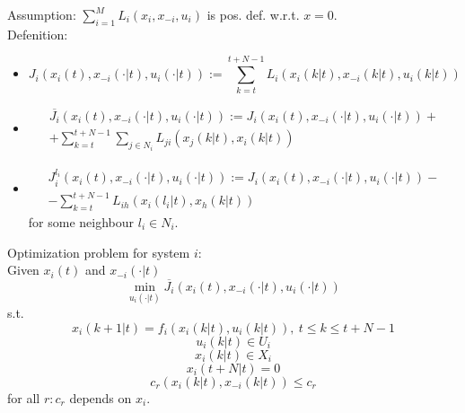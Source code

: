     Assumption: $\sum_{i=1}^M L_i(x_i,x_{-i},u_i)$ is pos. def. w.r.t. $x=0$.\\
    
    Defenition:
    \begin{itemize}
        \item    $$J_i(x_i(t),x_{-i}(\cdot|t),u_i(\cdot|t)) := \sum_{k=t}^{t+N-1} L_i(x_i(k|t),x_{-i}(k|t), u_i(k|t))$$
        \item 
            \begin{multline*} 
            \overline{J_i}(x_i(t),x_{-i}(\cdot|t),u_i(\cdot|t)) := J_i(x_i(t),x_{-i}(\cdot|t),u_i(\cdot|t)) + \\ + \sum_{k=t}^{t+N-1} \sum_{j \in N_i} L_{ji}(x_j(k|t),x_i(k|t))
            \end{multline*}
        \item 
            \begin{multline*}
            J_i^{l_i}(x_i(t),x_{-i}(\cdot|t),u_i(\cdot|t)) := J_i(x_i(t),x_{-i}(\cdot|t),u_i(\cdot|t)) - \\ - \sum_{k=t}^{t+N-1}L_{ih}(x_i(l_i|t),x_h(k|t))
            \end{multline*}
            for some neighbour $l_i \in N_i$.
    \end{itemize}
    
    Optimization problem for system $i$:\\
    Given $x_i(t)$ and $x_{-i}(\cdot|t)$ \\
    \begin{equation}
        \min_{u_i(\cdot|t)} \overline{J_i}(x_i(t),x_{-i}(\cdot|t),u_i(\cdot|t))
    \end{equation}
    s.t. 
    $$x_i(k+1|t) = f_i(x_i(k|t),u_i(k|t)), \ t \le k \le t+N-1$$
    $$u_i(k|t) \in U_i$$
    $$x_i(k|t) \in X_i$$
    $$x_i(t+N|t) = 0$$
    $$c_r(x_i(k|t),x_{-i}(k|t)) \le c_r$$
    for all $r: c_r$ depends on $x_i$.\\
    

